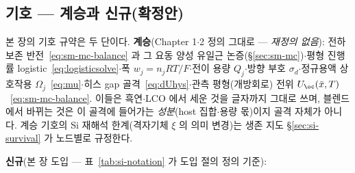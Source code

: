 \subsection*{기호 --- 계승과 신규(확정안)}
본 장의 기호 규약은 두 단이다. \textbf{계승}(Chapter 1$\cdot$2 정의 그대로 --- \emph{재정의
없음}): 전하 보존 반전~\eqref{eq:sm-mc-balance} 과 그 요동 양성 유일근 논증(\S\ref{sec:sm-mc})$\cdot$평형
진행률 logistic~\eqref{eq:logisticsolve}$\cdot$폭 $w_j=n_jRT/F$$\cdot$전이 용량 $Q_j$$\cdot$방향 부호
$\sigma_d$$\cdot$정규용액 상호작용 $\Omega_j$~\eqref{eq:mu}$\cdot$히스 gap 골격~\eqref{eq:dUhys}$\cdot$관측
평형(개방회로) 전위 $U_\oc(\bar x,T)$~\eqref{eq:sm-mc-balance}. 이들은 흑연$\cdot$LCO 에서 세운 것을
글자까지 그대로 쓰며, 블렌드에서 바뀌는 것은 이 골격에 들어가는 \emph{성분}(host 집합$\cdot$용량 몫)이지
골격 자체가 아니다. 계승 기호의 Si 재해석 한계(격자기체 $\xi$ 의 의미 변경)는 생존 지도
\S\ref{sec:si-survival} 가 노드별로 규정한다.

\textbf{신규}(본 장 도입 --- 표~\ref{tab:si-notation} 가 도입 절의 정의 기준):

